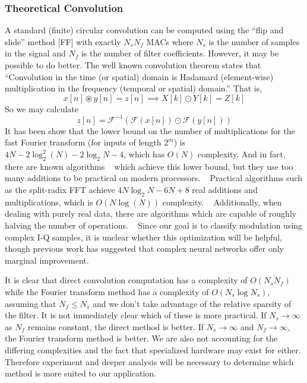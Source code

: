 \subsubsection{Theoretical Convolution}
A standard (finite) circular convolution can be computed using the ``flip and slide'' method [FF] with exactly $N_s N_f$ MACs where $N_s$ is the number of samples in the signal and $N_f$ is the number of filter coefficients.  However, it may be possible to do better.
The well known convolution theorem states that ``Convolution in the time (or spatial) domain is Hadamard (element-wise) multiplication in the frequency (temporal or spatial) domain.''  That is,
$$ x[n]\circledast y[n] = z[n] \implies X[k] \odot Y[k] = Z[k]$$
So we may calculate
$$ z[n] = \mathcal{F}^{-1}(\mathcal{F}(x[n]) \odot \mathcal{F}(y[n]))$$
It has been show that the lower bound on the number of multiplications for the fast Fourier transform (for inputs of length $2^m$) is $ 4N - 2\log_2^2(N) - 2\log_2N - 4$, which has $O(N)$ complexity.  And in fact, there are known algorithms ~\cite{Winograd} which achieve this lower bound, but they use too many additions to be practical on modern processors. ~\cite{Duhamel:1990:FFT:78772.78773}  Practical algorithms such as the split-radix FFT achieve $4N\log_2{N} - 6N + 8$ real additions and multiplications, which is $O(N\log(N))$ complexity. ~\cite{Yavne:1968:EMC:1476589.1476610}  Additionally, when dealing with purely real data, there are algorithms which are capable of roughly halving the number of operations. ~\cite{Bergland:1968:NAF:364096.364118} Since our goal is to classify modulation using complex I-Q samples, it is unclear whether this optimization will be helpful, though previous work has suggested that complex neural networks offer only marginal improvement. ~\cite{DBLP:journals/corr/TrabelsiBSSSMRB17}

It is clear that direct convolution computation has a complexity of $O(N_sN_f)$ while the Fourier transform method has a complexity of $O(N_s\log N_s)$, assuming that $N_f \leq N_s$ and we don't take advantage of the relative sparsity of the filter.  It is not immediately clear which of these is more practical.  If $N_s \rightarrow \infty$ as $N_f$ remains constant, the direct method is better.  If $N_s \rightarrow \infty$ and $N_f \rightarrow \infty$, the Fourier transform method is better.  We are also not accounting for the differing complexities and the fact that specialized hardware may exist for either.  Therefore experiment and deeper analysis will be necessary to determine which method is more suited to our application.

